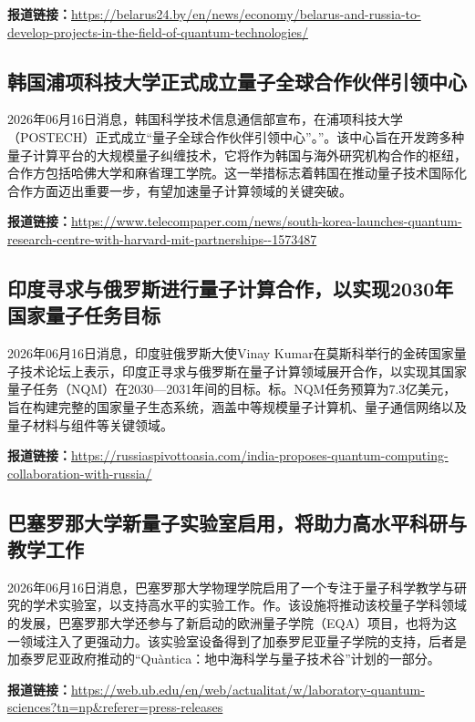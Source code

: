 \documentclass[12pt,a4paper]{ctexart}
\begin{document}
\noindent\textbf{报道链接：}\url{https://belarus24.by/en/news/economy/belarus-and-russia-to-develop-projects-in-the-field-of-quantum-technologies/}

\subsection{ 韩国浦项科技大学正式成立量子全球合作伙伴引领中心 }

2026年06月16日消息，韩国科学技术信息通信部宣布，在浦项科技大学（POSTECH）正式成立“量子全球合作伙伴引领中心”。”。该中心旨在开发跨多种量子计算平台的大规模量子纠缠技术，它将作为韩国与海外研究机构合作的枢纽，合作方包括哈佛大学和麻省理工学院。这一举措标志着韩国在推动量子技术国际化合作方面迈出重要一步，有望加速量子计算领域的关键突破。

\noindent\textbf{报道链接：}\url{https://www.telecompaper.com/news/south-korea-launches-quantum-research-centre-with-harvard-mit-partnerships--1573487}

\subsection{ 印度寻求与俄罗斯进行量子计算合作，以实现2030年国家量子任务目标 }

2026年06月16日消息，印度驻俄罗斯大使Vinay Kumar在莫斯科举行的金砖国家量子技术论坛上表示，印度正寻求与俄罗斯在量子计算领域展开合作，以实现其国家量子任务（NQM）在2030—2031年间的目标。标。NQM任务预算为7.3亿美元，旨在构建完整的国家量子生态系统，涵盖中等规模量子计算机、量子通信网络以及量子材料与组件等关键领域。

\noindent\textbf{报道链接：}\url{https://russiaspivottoasia.com/india-proposes-quantum-computing-collaboration-with-russia/}

\subsection{ 巴塞罗那大学新量子实验室启用，将助力高水平科研与教学工作 }

2026年06月16日消息，巴塞罗那大学物理学院启用了一个专注于量子科学教学与研究的学术实验室，以支持高水平的实验工作。作。该设施将推动该校量子学科领域的发展，巴塞罗那大学还参与了新启动的欧洲量子学院（EQA）项目，也将为这一领域注入了更强动力。该实验室设备得到了加泰罗尼亚量子学院的支持，后者是加泰罗尼亚政府推动的“Quàntica：地中海科学与量子技术谷”计划的一部分。

\noindent\textbf{报道链接：}\url{https://web.ub.edu/en/web/actualitat/w/laboratory-quantum-sciences?tn=np\&referer=press-releases}
\end{document}

